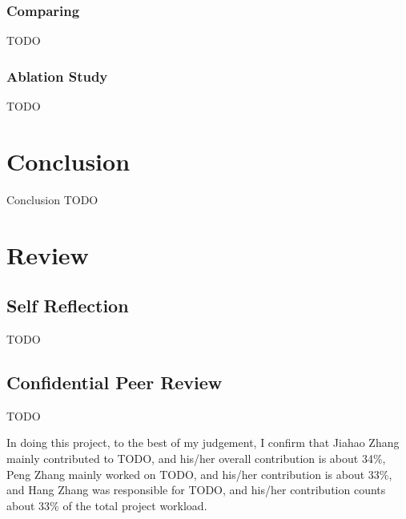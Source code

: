 \documentclass[final]{cvpr}
\begin{document}
\subsubsection{Comparing}

TODO

\subsubsection{Ablation Study}

TODO

\section{Conclusion}

Conclusion TODO




\section{Review}

\subsection{Self Reflection}

TODO

\subsection{Confidential Peer Review}

TODO

In doing this project, to the best of my judgement,
I confirm that Jiahao Zhang mainly contributed to TODO,
and his/her overall contribution is about 34\%,
Peng Zhang mainly worked on TODO,
and his/her contribution is about 33\%,
and Hang Zhang was responsible for TODO,
and his/her contribution counts about 33\% of the total project workload.
\end{document}
